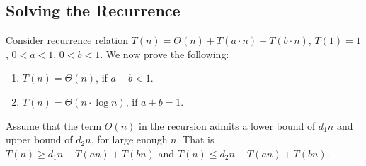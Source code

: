 
\subsection*{Solving the Recurrence}

Consider recurrence relation $T(n) = \Theta(n) + T(a\cdot n) + T(b\cdot n)$, $T(1) = 1$, {$0 < a < 1$, $0< b< 1$}.
We now prove the following:
\begin{enumerate}
\item $T(n) = \Theta(n)$, if $a + b < 1$.
\item $T(n) = \Theta(n\cdot \log n)$, if $a + b = 1$.
\end{enumerate}

Assume that the term $\Theta(n)$ in the recursion admits a lower bound of $d_1 n$ and upper bound of $d_2 n$, for large enough $n$.
That is $T(n) \ge d_1n + T(an) + T(bn)$ and $T(n) \le d_2n + T(an) + T(bn)$.


